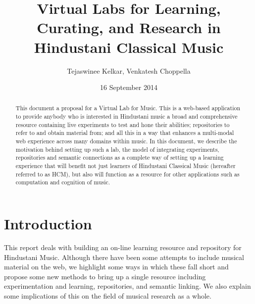 \documentclass{tufte-handout}
\title{Virtual Labs for Learning, Curating, and Research in Hindustani Classical Music}
\author{Tejaswinee Kelkar,
 Venkatesh Choppella}
\date{16 September 2014}
\begin{document}
\maketitle%

\begin{abstract}
\noindent This document a proposal for a Virtual Lab for Music. 
This is a web-based application to provide anybody who is interested in Hindustani music a broad and comprehensive resource containing live experiments to test and hone their abilities; repositories to refer to and obtain material from; and all this in a way that enhances a multi-modal web experience across many domains within music.
In this document, we describe the motivation behind setting up such a lab, the model of integrating experiments, repositories and semantic connections as a complete way of setting up a learning experience that will benefit not just learners of Hindustani Classical Music (hereafter referred to as HCM), but also will function as a resource for other applications such as computation and cognition of music.
\end{abstract}


\section{Introduction}\label{sec:introduction}
This report deals with building an on-line learning resource and repository for Hindustani Music. Although there have been some attempts to include musical material on the web, we highlight some ways in which these fall short and propose some new methods to bring up a single resource including experimentation and learning, repositories, and semantic linking. We also explain some implications of this on the field of musical research as a whole.
\end{document}
